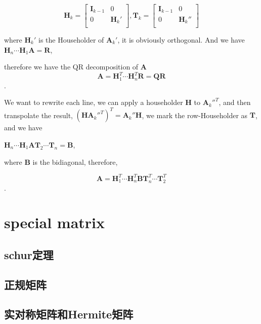 \documentclass[UTF8]{../../09-Mathematics}
\begin{document}
$$
\boldsymbol H_k  = 
\begin{bmatrix}
\boldsymbol I_{k-1}& 0\\
0& \boldsymbol H_{k}'\\
\end{bmatrix},
\boldsymbol T_k  = 
\begin{bmatrix}
\boldsymbol I_{k-1}& 0\\
0& \boldsymbol H_{k}''\\
\end{bmatrix}
$$

where $\boldsymbol H_{k}'$ is the Householder of $\boldsymbol A_{k}'$, it is obviously orthogonal. And we have
$\boldsymbol H_n \cdots \boldsymbol H_{1} \boldsymbol A= \boldsymbol R$, 

therefore we have the QR decomposition of $\boldsymbol A$
$$
\boldsymbol A= \boldsymbol H_{1}^T \cdots \boldsymbol H_{n}^T  \boldsymbol R =  \boldsymbol Q  \boldsymbol R 
$$.

We want to rewrite each line, we can apply a householder $ \boldsymbol H$ to $ \boldsymbol A_k''^T$, and then transpolate the result, $(\boldsymbol H \boldsymbol A_k''^T)^T =\boldsymbol A_k''\boldsymbol H $, we mark the row-Householder as $ \boldsymbol T$, and we have

$\boldsymbol H_n \cdots \boldsymbol H_1 \boldsymbol A \boldsymbol T_2 \cdots \boldsymbol T_n= \boldsymbol B$,

where $\boldsymbol B$ is the bidiagonal, therefore,

$$
\boldsymbol A= \boldsymbol H_{1}^T \cdots \boldsymbol H_{n}^T  \boldsymbol B 
\boldsymbol T_{n}^T \cdots \boldsymbol T_{2}^T
$$.



\chapter{special matrix}
\section{schur定理}

\section{正规矩阵}

\section{实对称矩阵和Hermite矩阵}
\end{document}
